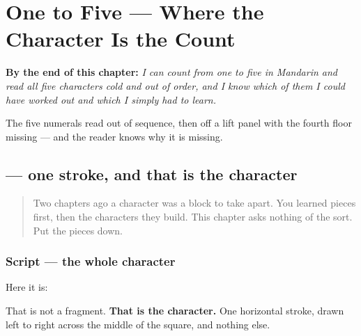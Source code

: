 
\chapter{One to Five — Where the Character Is the Count}
\label{ch:zh-numbers}

\begin{chapteropening}
\textbf{By the end of this chapter:} \emph{I can count from one to five in Mandarin and read all five characters cold and out of order, and I know which of them I could have worked out and which I simply had to learn.}

The five numerals read out of sequence, then off a lift panel with the fourth floor missing — and the reader knows why it is missing.
\end{chapteropening}

\section[\texorpdfstring{\zh{一} (yī)}{一 (yī)}]{ — one stroke, and that is the character}

\label{lesson:ZH-W03-yi}



\begin{quote}
Two chapters ago a character was a block to take apart. You learned pieces first, then the characters they build. This chapter asks nothing of the sort. Put the pieces down.
\end{quote}

\subsection*{Script — the whole character}

Here it is:

\begin{quote}
\end{quote}

That is not a fragment. \textbf{That is the character.} One horizontal stroke, drawn left to right across the middle of the square, and nothing else.

